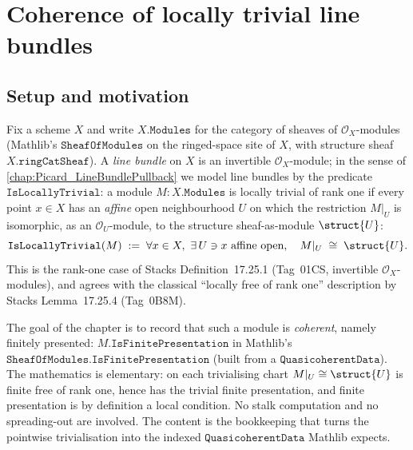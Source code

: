 \chapter{Coherence of locally trivial line bundles}
\label{chap:Picard_LineBundleCoherence}


\section{Setup and motivation}
\label{sec:lbc_setup}

Fix a scheme \(X\) and write \(X.\mathtt{Modules}\) for the category of sheaves
of \(\mathcal{O}_X\)-modules (Mathlib's \(\mathtt{SheafOfModules}\) on the
ringed-space site of \(X\), with structure sheaf \(X.\mathtt{ringCatSheaf}\)).
A \emph{line bundle} on \(X\) is an invertible \(\mathcal{O}_X\)-module; in the
sense of \cref{chap:Picard_LineBundlePullback} we model line bundles by the
predicate \(\texttt{IsLocallyTrivial}\): a module \(M : X.\mathtt{Modules}\) is locally
trivial of rank one if every point \(x \in X\) has an \emph{affine} open
neighbourhood \(U\) on which the restriction \(M|_U\) is isomorphic, as an
\(\mathcal{O}_U\)-module, to the structure sheaf-as-module \(\struct{U}\):
\[
  \texttt{IsLocallyTrivial}(M) \;:=\;
  \forall x \in X,\ \exists\, U \ni x \text{ affine open},\quad
  M|_U \;\cong\; \struct{U}.
\]
This is the rank-one case of Stacks Definition~17.25.1
(Tag~01CS, invertible \(\mathcal{O}_X\)-modules), and
agrees with the classical ``locally free of rank one'' description by Stacks
Lemma~17.25.4 (Tag~0B8M).

The goal of the chapter is to record that such a module is \emph{coherent},
namely finitely presented:
\(M.\mathtt{IsFinitePresentation}\) in Mathlib's
\(\mathtt{SheafOfModules.IsFinitePresentation}\) (built from a
\(\mathtt{QuasicoherentData}\)). The mathematics is elementary: on each
trivialising chart \(M|_U \cong \struct{U}\) is finite free of rank one, hence
has the trivial finite presentation, and finite presentation is by definition a
local condition. No stalk computation and no spreading-out are involved. The
content is the bookkeeping that turns the pointwise trivialisation into the
indexed \(\mathtt{QuasicoherentData}\) Mathlib expects.


